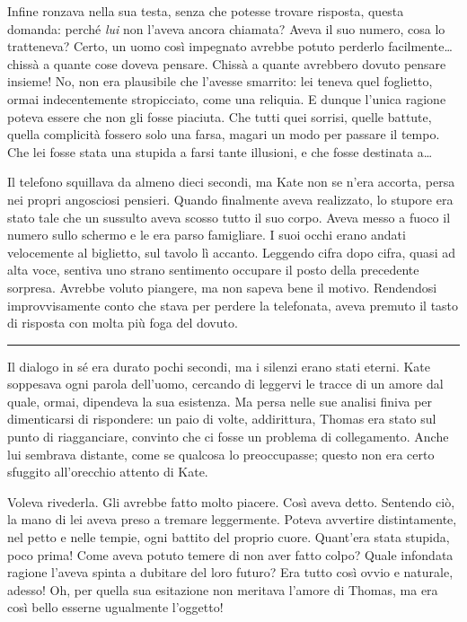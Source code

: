 \documentclass[a4paper,oneside,11pt]{memoir}
\begin{document}
Infine ronzava nella sua testa, senza che potesse trovare risposta, questa
domanda: perché \emph{lui} non l'aveva ancora chiamata? Aveva il suo numero,
cosa lo tratteneva? Certo, un uomo così impegnato avrebbe potuto perderlo
facilmente\dots{} chissà a quante cose doveva pensare. Chissà a quante avrebbero
dovuto pensare insieme! No, non era plausibile che l'avesse smarrito: lei teneva
quel foglietto, ormai indecentemente stropicciato, come una reliquia. E dunque
l'unica ragione poteva essere che non gli fosse piaciuta. Che tutti quei
sorrisi, quelle battute, quella complicità fossero solo una farsa, magari un
modo per passare il tempo. Che lei fosse stata una stupida a farsi tante
illusioni, e che fosse destinata a\dots{}

Il telefono squillava da almeno dieci secondi, ma Kate non se n'era accorta,
persa nei propri angosciosi pensieri. Quando finalmente aveva realizzato, lo
stupore era stato tale che un sussulto aveva scosso tutto il suo corpo. Aveva
messo a fuoco il numero sullo schermo e le era parso famigliare. I suoi occhi
erano andati velocemente al biglietto, sul tavolo lì accanto. Leggendo cifra
dopo cifra, quasi ad alta voce, sentiva uno strano sentimento occupare il posto
della precedente sorpresa. Avrebbe voluto piangere, ma non sapeva bene il
motivo. Rendendosi improvvisamente conto che stava per perdere la telefonata,
aveva premuto il tasto di risposta con molta più foga del dovuto.

\plainbreak{1}

Il dialogo in sé era durato pochi secondi, ma i silenzi erano stati eterni. Kate
soppesava ogni parola dell'uomo, cercando di leggervi le tracce di un amore dal
quale, ormai, dipendeva la sua esistenza. Ma persa nelle sue analisi finiva per
dimenticarsi di rispondere: un paio di volte, addirittura, Thomas era stato sul
punto di riagganciare, convinto che ci fosse un problema di collegamento. Anche
lui sembrava distante, come se qualcosa lo preoccupasse; questo non era certo
sfuggito all'orecchio attento di Kate.

Voleva rivederla. Gli avrebbe fatto molto piacere. Così aveva detto. Sentendo
ciò, la mano di lei aveva preso a tremare leggermente. Poteva avvertire
distintamente, nel petto e nelle tempie, ogni battito del proprio cuore.
Quant'era stata stupida, poco prima! Come aveva potuto temere di non aver fatto
colpo? Quale infondata ragione l'aveva spinta a dubitare del loro futuro? Era
tutto così ovvio e naturale, adesso! Oh, per quella sua esitazione non meritava
l'amore di Thomas, ma era così bello esserne ugualmente l'oggetto!
\end{document}
